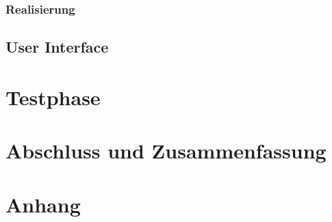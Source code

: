 \documentclass[11pt]{article}
\begin{document}
\subsubsection{Realisierung}

\subsection{User Interface}


\section{Testphase}


\section{Abschluss und Zusammenfassung}


\section{Anhang}
\end{document}
